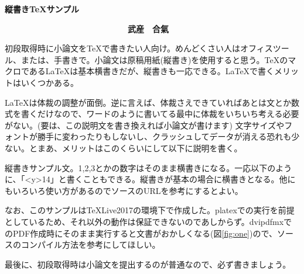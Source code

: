 ﻿\documentclass[a4j,12pt,landscape]{tarticle}
\begin{document}
\rmfamily\mcfamily
\vspace{3.5cm}
\textbf{\huge 縦書き\TeX サンプル}

\vspace{0.5cm}
\hspace{2.5cm}

\begin{center}
  \textbf{\large 　　　　　　　　　　　　　　　武産　合氣}
\end{center}

\hspace{2.5cm}



初段取得時に小論文を\TeX で書きたい人向け。めんどくさい人はオフィスツール、または、手書きで。小論文は原稿用紙(縦書き)を使用すると思う。\TeX のマクロである\LaTeX は基本横書きだが、縦書きも一応できる。\LaTeX で書くメリットはいくつかある。\par
\LaTeX は体裁の調整が面倒。逆に言えば、体裁さえできていればあとは文とか数式を書くだけなので、ワードのように書いてる最中に体裁をいちいち考える必要がない。(要は、この説明文を書き換えれば小論文が書けます) 文字サイズやフォントが勝手に変わったりもしないし、クラッシュしてデータが消える恐れも少ない。とまあ、メリットはこのくらいにして以下に説明を書く。\par
縦書きサンプル文。1,2,3とかの数字はそのまま横書きになる。一応以下のように、「\pbox<y>{14}」と書くこともできる。縦書きが基本の場合に横書きとなる。他にもいろいろ使い方があるのでソースのURLを参考にするとよい。\par
なお、このサンプルは\TeX Live2017の環境下で作成した。platexでの実行を前提としているため、それ以外の動作は保証できないのであしからず。dvipdfmxでのPDF作成時にそのまま実行すると文書がおかしくなる(図\ref{fig:one})ので、ソースのコンパイル方法を参考にしてほしい。\par
最後に、初段取得時は小論文を提出するのが普通なので、必ず書きましょう。%


\vspace{1cm}
\end{document}
